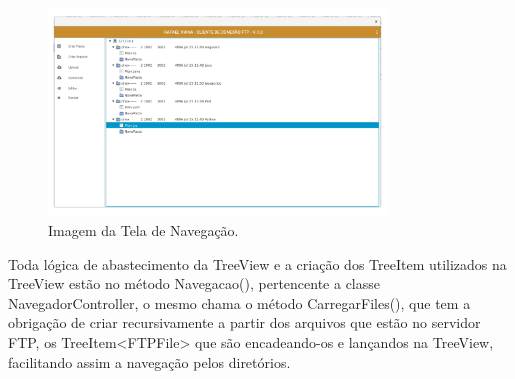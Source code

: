 \documentclass[12pt]{article}
\begin{document}
\begin{figure}[H]
	\centering
	\includegraphics[width=0.8\textwidth]{Imagens/02.png}
	\caption{ Imagem da Tela de Navegação.}
	\label{fig:03}
\end{figure}


Toda lógica de abastecimento da TreeView e a criação dos TreeItem utilizados na TreeView estão no método Navegacao(), pertencente a classe NavegadorController, o mesmo chama o método CarregarFiles(), que tem a obrigação de criar recursivamente a partir dos arquivos que estão no servidor FTP, os TreeItem<FTPFile> que são encadeando-os e lançandos na TreeView, facilitando assim a navegação pelos diretórios.
\end{document}
